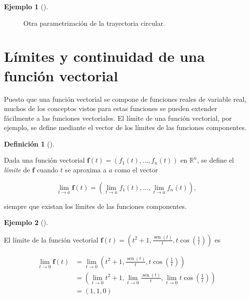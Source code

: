 \documentclass[
  a4paper,
]{scrreport}
\theoremstyle{definition}
\newtheorem{example}{Ejemplo}[chapter]
\theoremstyle{plain}
\theoremstyle{definition}
\newtheorem{definition}{Definición}[chapter]
\theoremstyle{definition}
\theoremstyle{plain}
\theoremstyle{plain}
\theoremstyle{remark}
\begin{document}
\begin{example}[]
\begin{figure}[H]
{}

\caption{Otra parametrización de la trayectoria circular.}

\end{figure}%

\end{example}

\section{Límites y continuidad de una función
vectorial}\label{luxedmites-y-continuidad-de-una-funciuxf3n-vectorial}

Puesto que una función vectorial se compone de funciones reales de
variable real, muchos de los conceptos vistos para estas funciones se
pueden extender fácilmente a las funciones vectoriales. El límite de una
función vectorial, por ejemplo, se define mediante el vector de los
límites de las funciones componentes.

\begin{definition}[]\protect\hypertarget{def-limite-funcion-vectorial}{}\label{def-limite-funcion-vectorial}

Dada una función vectorial \(\mathbf{f}(t)=(f_1(t),\ldots,f_n(t))\) en
\(\mathbb{R}^n\), se define el \emph{límite} de \(\mathbf{f}\) cuando
\(t\) se aproxima a \(a\) como el vector

\[
\lim_{t\to a} \mathbf{f}(t) = \left(\lim_{t\to a} f_1(t), \ldots, \lim_{t\to a} f_n(t)\right),
\]

siempre que existan los límites de las funciones componentes.

\end{definition}

\begin{example}[]\protect\hypertarget{exm-limite-funciones-vectoriales}{}\label{exm-limite-funciones-vectoriales}

El límite de la función vectorial
\(\mathbf{f}(t)=\left(t^2+1, \frac{\operatorname{sen}(t)}{t}, t\cos\left(\frac{1}{t}\right)\right)\)
es

\begin{align*}
\lim_{t\to 0} \mathbf{f}(t)
&= \lim_{t\to 0}\left(t^2+1, \frac{\operatorname{sen}(t)}{t}, t\cos\left(\frac{1}{t}\right)\right) \\
&= \left(\lim_{t\to 0} t^2+1, \lim_{t\to 0} \frac{\operatorname{sen}(t)}{t}, \lim_{t\to 0} t\cos\left(\frac{1}{t}\right)\right) \\
&= (1, 1, 0)
\end{align*}

\end{example}
\end{document}
